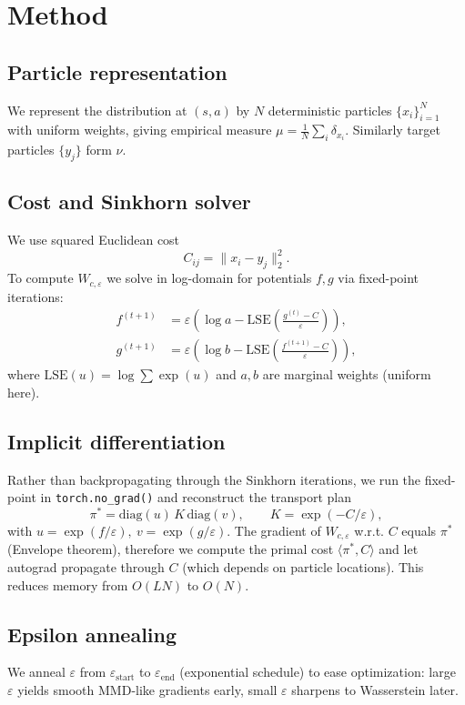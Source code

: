 \documentclass{article}
\begin{document}
\section{Method}
\subsection{Particle representation}
We represent the distribution at $(s,a)$ by $N$ deterministic particles $\{x_i\}_{i=1}^N$ with uniform weights, giving empirical measure $\mu=\tfrac{1}{N}\sum_i\delta_{x_i}$. Similarly target particles $\{y_j\}$ form $\nu$.

\subsection{Cost and Sinkhorn solver}
We use squared Euclidean cost
\begin{equation}
C_{ij}=\lVert x_i-y_j\rVert_2^2.
\end{equation}
To compute $W_{c,\varepsilon}$ we solve in log-domain for potentials $f,g$ via fixed-point iterations:
\begin{align}
f^{(t+1)}&=\varepsilon\left(\log a - \mathrm{LSE}\left(\frac{g^{(t)}-C}{\varepsilon}\right)\right),\\
g^{(t+1)}&=\varepsilon\left(\log b - \mathrm{LSE}\left(\frac{f^{(t+1)}-C}{\varepsilon}\right)\right),
\end{align}
where $\mathrm{LSE}(u)=\log\sum\exp(u)$ and $a,b$ are marginal weights (uniform here).

\subsection{Implicit differentiation}
Rather than backpropagating through the Sinkhorn iterations, we run the fixed-point in \texttt{torch.no\_grad()} and reconstruct the transport plan
\begin{equation}
\pi^*=\mathrm{diag}(u)\,K\,\mathrm{diag}(v),\qquad K=\exp(-C/\varepsilon),
\end{equation}
with $u=\exp(f/\varepsilon),\ v=\exp(g/\varepsilon)$. The gradient of $W_{c,\varepsilon}$ w.r.t. $C$ equals $\pi^*$ (Envelope theorem), therefore we compute the primal cost $\langle\pi^*,C\rangle$ and let autograd propagate through $C$ (which depends on particle locations). This reduces memory from $O(LN)$ to $O(N)$.

\subsection{Epsilon annealing}
We anneal $\varepsilon$ from $\varepsilon_{\mathrm{start}}$ to $\varepsilon_{\mathrm{end}}$ (exponential schedule) to ease optimization: large $\varepsilon$ yields smooth MMD-like gradients early, small $\varepsilon$ sharpens to Wasserstein later.
\end{document}

